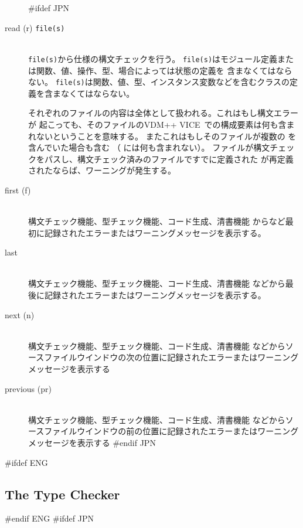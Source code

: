\documentclass[\pformat,12pt]{article}
\newcommand{\vdmslpp}{VDM-SL}
\newcommand{\vdmslpp}{VDM++}
\renewcommand{\vdmslpp}{VDM++ VICE}
\begin{document}
\begin{description}
#ifdef JPN
\item[read (r) {\tt file(s)}] \mbox{}\\
  {\tt file(s)}から仕様の構文チェックを行う。
    {
      {\tt file(s)}はモジュール定義または関数、値、操作、型、場合によっては状態の定義を
      含まなくてはならない。
    }%
    {
      {\tt file(s)}は関数、値、型、インスタンス変数などを含むクラスの定義を含まなくてはならない。
    }

  それぞれのファイルの内容は全体として扱われる。これはもし構文エラーが
  起こっても、そのファイルの\vdmslpp\ での構成要素は何も含まれないということを意味する。
  またこれはもしそのファイルが複数の
   を含んでいた場合も含む
  （  には何も含まれない）。
  ファイルが構文チェックをパスし、構文チェック済みのファイルですでに定義された
   が再定義
  されたならば、ワーニングが発生する。

\item[first (f)] \mbox{}\\
  構文チェック機能、型チェック機能、コード生成、清書機能
  からなど最初に記録されたエラーまたはワーニングメッセージを表示する。

\item[last] \mbox{}\\
  構文チェック機能、型チェック機能、コード生成、清書機能
  などから最後に記録されたエラーまたはワーニングメッセージを表示する。

\item[next (n) \index{nextコマンド}]\mbox{}\\
  構文チェック機能、型チェック機能、コード生成、清書機能
  などからソースファイルウインドウの次の位置に記録されたエラーまたはワーニングメッセージを表示する

\item[previous (pr)] \mbox{}\\
  構文チェック機能、型チェック機能、コード生成、清書機能
  などからソースファイルウインドウの前の位置に記録されたエラーまたはワーニングメッセージを表示する
#endif JPN

\end{description}

\newpage
#ifdef ENG
\subsection{The Type Checker}\label{sec:tc}
\label{sec:def-typechedk}\label{type check} 
#endif ENG
#ifdef JPN
\end{document}
